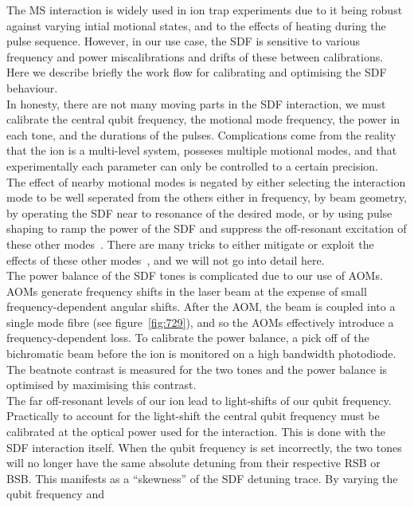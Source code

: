     The MS interaction is widely used in ion trap experiments due to it being robust against varying intial motional states, and to the effects of heating during the pulse sequence. However, in our use case, the SDF is sensitive to various frequency and power miscalibrations and drifts of these between calibrations.  Here we describe briefly the work flow for calibrating and optimising the SDF behaviour.\\
    In honesty, there are not many moving parts in the SDF interaction, we must calibrate the central qubit frequency, the motional mode frequency, the power in each tone, and the durations of the pulses. Complications come from the reality that the ion is a multi-level system, posseses multiple motional modes, and that experimentally each parameter can only be controlled to a certain precision.\\
    The effect of nearby motional modes is negated by either selecting the
    interaction mode to be well seperated from the others either in frequency, by beam geometry, by
    operating the SDF near to resonance of the desired mode, or by using pulse
    shaping to ramp the power of the SDF and suppress the off-resonant
    excitation of these other modes~\cite{}. There are many tricks to either mitigate or
    exploit the effects of these other modes~\cite{}, and we will not go into detail
    here. \\
    The power balance of the SDF tones is complicated due to our use of AOMs.
    AOMs generate frequency shifts in the laser beam at the expense of small
    frequency-dependent angular shifts. After the AOM, the beam is coupled into a
    single mode fibre (see figure~\ref{fig:729}), and so the AOMs effectively introduce a
    frequency-dependent loss. To calibrate the power balance, a pick
    off of the bichromatic beam before the ion is monitored on a high bandwidth photodiode.
    The beatnote contrast is measured for the two tones and the power
    balance is optimised by maximising this contrast.\\
    The far off-resonant levels of our ion lead to light-shifts of our qubit
    frequency. Practically to account for the light-shift the central qubit frequency must be calibrated at the
    optical power used for the interaction. This is done with the SDF interaction
    itself. When the qubit frequency is set incorrectly, the two tones will no
    longer have the same absolute detuning from their respective RSB or BSB.
    This manifests as a ``skewness'' of the SDF detuning trace. By varying the qubit frequency and
